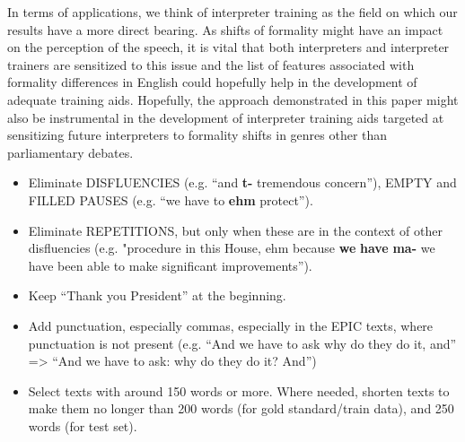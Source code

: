 \documentclass[output=paper]{langscibook}
\begin{document}
In terms of applications, we think of interpreter training as the field on which our results have a more direct bearing. As shifts of formality might have an impact on the perception of the speech, it is vital that both interpreters and interpreter trainers are sensitized to this issue and the list of features associated with formality differences in English  could hopefully help in the development of adequate training aids. Hopefully, the approach demonstrated in this paper might also be instrumental in the development of interpreter training aids targeted at sensitizing future interpreters to formality shifts in genres other than parliamentary debates.


\appendixsection{}\label{ap:ivaska:1}


\begin{itemize}
\item 
Eliminate DISFLUENCIES (e.g. “and \textbf{t-} tremendous concern”), EMPTY and FILLED PAUSES (e.g. “we have to \textbf{ehm} protect”).

\item 
Eliminate REPETITIONS, but only when these are in the context of other disfluencies (e.g. "procedure in this House, ehm because \textbf{we} \textbf{have} \textbf{ma-} we have been able to make significant improvements”).

\item 
Keep “Thank you President” at the beginning.

\item 
Add punctuation, especially commas, especially in the EPIC texts, where punctuation is not present (e.g. “And we have to ask why do they do it, and” => “And we have to ask: why do they do it? And”)

\item 
Select texts with around 150 words or more. Where needed, shorten texts to make them no longer than 200 words (for gold standard/train data), and 250 words (for test set).

\end{itemize}


\end{document}
